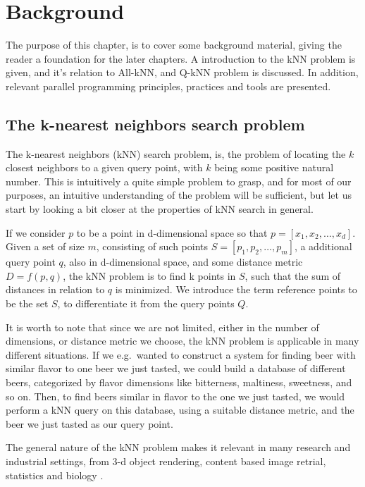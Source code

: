 \chapter{Background}

The purpose of this chapter, is to cover some background material, giving the reader a foundation for the later chapters. A introduction to the kNN problem is given, and it's relation to All-kNN, and Q-kNN problem is discussed. In addition, relevant parallel programming principles, practices and tools are presented.

\section{The k-nearest neighbors search problem} %
\label{a_short_introduction_to_kNN_search_problem}

The k-nearest neighbors (kNN) search problem, is, the problem of locating the $k$ closest neighbors to a given query point, with $k$ being some positive natural number. This is intuitively a quite simple problem to grasp, and for most of our purposes, an intuitive understanding of the problem will be sufficient, but let us start by looking a bit closer at the properties of kNN search in general.

If we consider $p$ to be a point in d-dimensional space so that $p = [x_1, x_2,\dots, x_d]$. Given a set of size $m$, consisting of such points $S = [p_1, p_2,\dots, p_m]$, a additional query point $q$, also in d-dimensional space, and some distance metric $D = f(p, q)$, the kNN problem is to find k points in $S$, such that the sum of distances in relation to $q$ is minimized. We introduce the term reference points to be the set $S$, to differentiate it from the query points $Q$. 

It is worth to note that since we are not limited, either in the number of dimensions, or distance metric we choose, the kNN problem is applicable in many different situations. If we e.g.\ wanted to construct a system for finding beer with similar flavor to one beer we just tasted, we could build a database of different beers, categorized by flavor dimensions like bitterness, maltiness, sweetness, and so on. Then, to find beers similar in flavor to the one we just tasted, we would perform a kNN query on this database, using a suitable distance metric, and the beer we just tasted as our query point.

The general nature of the kNN problem makes it relevant in many research and industrial settings, from 3-d object rendering, content based image retrial, statistics and biology \citep[Introduction]{Garcia2010}.

